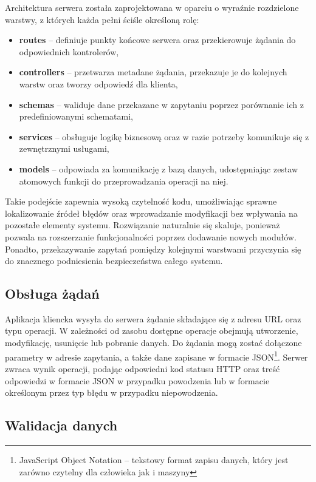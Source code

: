 Architektura serwera została zaprojektowana w oparciu o wyraźnie rozdzielone warstwy, z których każda pełni ściśle określoną rolę:
\begin{itemize}
    \item \textbf{routes} -- definiuje punkty końcowe serwera oraz przekierowuje żądania do odpowiednich kontrolerów,
    \item \textbf{controllers} -- przetwarza metadane żądania, przekazuje je do kolejnych warstw oraz tworzy odpowiedź dla klienta,
    \item \textbf{schemas} -- waliduje dane przekazane w zapytaniu poprzez porównanie ich z predefiniowanymi schematami,
    \item \textbf{services} -- obsługuje logikę biznesową oraz w razie potrzeby komunikuje się z zewnętrznymi usługami,
    \item \textbf{models} -- odpowiada za komunikację z bazą danych, udostępniając zestaw atomowych funkcji do przeprowadzania operacji na niej.
\end{itemize}
Takie podejście zapewnia wysoką czytelność kodu, umożliwiając sprawne lokalizowanie źródeł błędów oraz wprowadzanie modyfikacji bez wpływania na pozostałe elementy systemu.
Rozwiązanie naturalnie się skaluje, ponieważ pozwala na rozszerzanie funkcjonalności poprzez dodawanie nowych modułów.
Ponadto, przekazywanie zapytań pomiędzy kolejnymi warstwami przyczynia się do znacznego podniesienia bezpieczeństwa całego systemu.

\subsection{Obsługa żądań}

Aplikacja kliencka wysyła do serwera żądanie składające się z adresu URL oraz typu operacji.
W zależności od zasobu dostępne operacje obejmują utworzenie, modyfikację, usunięcie lub pobranie danych.
Do żądania mogą zostać dołączone parametry w adresie zapytania, a także dane zapisane w formacie JSON\footnote{JavaScript Object Notation -- tekstowy format zapisu danych, który jest zarówno czytelny dla człowieka jak i maszyny}.
Serwer zwraca wynik operacji, podając odpowiedni kod statusu HTTP \autocite{iana_httpcodes} oraz treść odpowiedzi w formacie JSON w przypadku powodzenia lub w formacie określonym przez typ błędu w przypadku niepowodzenia.

\subsection{Walidacja danych}

